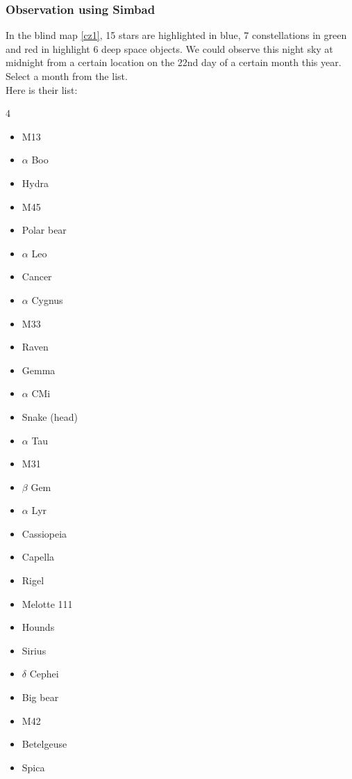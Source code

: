 \documentclass[a4paper,12pt]{extarticle}
\begin{document}
\subsubsection{Observation using Simbad}
In the blind map \ref{cz1}, 15 stars are highlighted in blue, 7 constellations in green and red in highlight 6 deep space objects. We could observe this night sky at midnight from a certain location on the 22nd day of a certain month this year. Select a month from the list.\\
Here is their list:
\begin{multicols}{4}
	\begin{itemize}
		\renewcommand{\labelitemi}{\textcolor{orange}{\(\bigstar\)}}
		\item M13 
		\item $\alpha$ Boo
		\item Hydra
		\item M45 
		\item Polar bear
		\item $\alpha$ Leo
		\item Cancer
		\item $\alpha$ Cygnus
		\item M33 
		\item Raven
		\item Gemma
		\item $\alpha$ CMi
		\item Snake (head)
		\item $\alpha$ Tau
		\item M31 
		\item  $\beta$ Gem
		\item $\alpha$ Lyr
		\item Cassiopeia
		\item Capella
		\item Rigel
		\item Melotte 111 
		\item  Hounds
		\item Sirius
		\item $\delta$ Cephei 
		\item Big bear
		\item  M42 
		\item Betelgeuse
		\item Spica
	\end{itemize}
\end{multicols}
\end{document}
